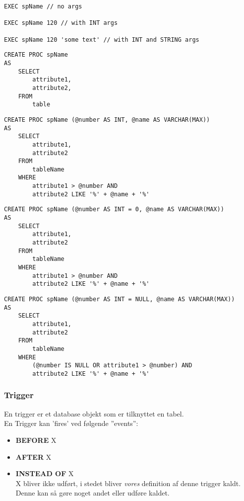 \begin{lstlisting}[caption=Kald af Stored Procedure.]
EXEC spName // no args

EXEC spName 120 // with INT args

EXEC spName 120 'some text' // with INT and STRING args
\end{lstlisting}

\begin{lstlisting}[caption=Eksempel på Stored Procedure uden parametre.]
CREATE PROC spName
AS 
	SELECT
		attribute1, 
		attribute2,
	FROM
		table
\end{lstlisting}

\begin{lstlisting}[caption=Eksempel på Stored Procedure med parametre.]
CREATE PROC spName (@number AS INT, @name AS VARCHAR(MAX))
AS 
	SELECT
		attribute1,
		attribute2
	FROM
		tableName
	WHERE
		attribute1 > @number AND
		attribute2 LIKE '%' + @name + '%'
\end{lstlisting}

\begin{lstlisting}[caption=Eksempel på Stored Procedure med 'optionel' parametre.]
CREATE PROC spName (@number AS INT = 0, @name AS VARCHAR(MAX))
AS 
	SELECT
		attribute1,
		attribute2
	FROM
		tableName
	WHERE
		attribute1 > @number AND
		attribute2 LIKE '%' + @name + '%'
\end{lstlisting}

\begin{lstlisting}[caption=Eksempel på Stored Procedure med 'optionel' parametre ('Avanceret').]
CREATE PROC spName (@number AS INT = NULL, @name AS VARCHAR(MAX))
AS 
	SELECT
		attribute1,
		attribute2
	FROM
		tableName
	WHERE
		(@number IS NULL OR attribute1 > @number) AND
		attribute2 LIKE '%' + @name + '%'
\end{lstlisting}

\subsubsection{Trigger}
En trigger er et database objekt som er tilknyttet en tabel.\\

En Trigger kan 'fires' ved følgende ''events'':

\begin{itemize}
	\item \textbf{BEFORE} X
	\item \textbf{AFTER} X
	\item \textbf{INSTEAD OF} X\\
	X bliver ikke udført, i stedet bliver \textit{vores} definition af denne trigger kaldt. Denne kan så gøre noget andet eller udføre kaldet.
\end{itemize}

